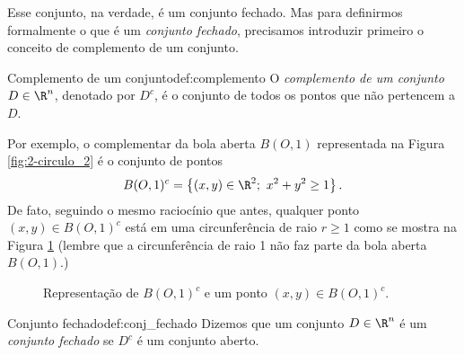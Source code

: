 \pagebreak
Esse conjunto, na verdade, é um conjunto fechado. Mas para definirmos formalmente o que é um \textit{conjunto fechado}, precisamos introduzir primeiro o conceito de complemento de um conjunto. 
\begin{definition}{Complemento de um conjunto}{def:complemento}
O \textit{complemento de um conjunto} \(D\in\R^n\), denotado por \(D^c\), é o conjunto de todos os pontos que não pertencem a \(D\).
\end{definition}


Por exemplo, o complementar da bola aberta $B(O,1)$ representada na Figura \ref{fig:2-circulo_2} é o conjunto de pontos 
$$ B(O,1)^c= \left\{(x,y)\in\R^2;~x^2+y^2 \geq 1\right\}.$$
De fato, seguindo o mesmo raciocínio que antes, qualquer ponto $(x,y)\in B(O,1)^c$ está em uma circunferência de raio $r\geq 1$ como se mostra na Figura \ref{fig:2-circulo_3} (lembre que a circunferência de raio 1 não faz parte da bola aberta $B(O,1)$.) 
\begin{figure}[!htb]
    \centering
{}
    \caption{Representação de $B(O,1)^c$ e um ponto $(x,y)\in B(O,1)^c$.}
    \label{fig:2-circulo_3}
  \end{figure}

\begin{definition}{Conjunto fechado}{def:conj_fechado}
Dizemos que um conjunto $D\in\R^n$ é um \textit{conjunto fechado} se $D^c$ é um conjunto aberto.     
\end{definition}

